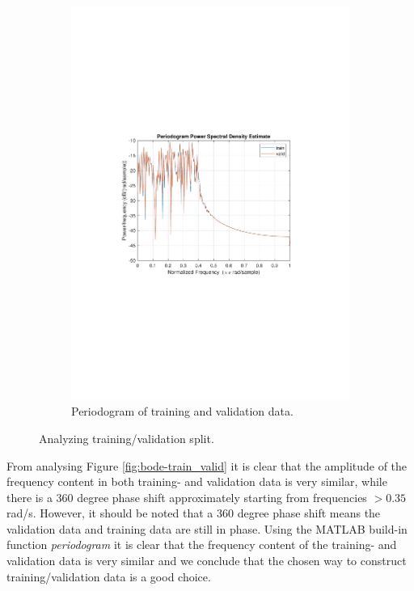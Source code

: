 \documentclass[]{article}
\begin{document}
\begin{figure}[ht]
\begin{subfigure}{.49\textwidth}
	\includegraphics[trim= 10cm 8cm 10cm 8cm, scale=0.4]{figures/periodogram-train_valid.pdf}
	\caption{Periodogram of training and validation data.}
	\label{fig:periodogram-train_valid}
\end{subfigure}
\caption{Analyzing training/validation split.}
\label{fig:train_valid}
\end{figure}

From analysing Figure \ref{fig:bode-train_valid} it is clear that the amplitude of the frequency content in both training- and validation data is very similar, while there is a 360 degree phase shift approximately starting from frequencies $>0.35$ rad/s. However, it should be noted that a 360 degree phase shift means the validation data and training data are still in phase. Using the MATLAB build-in function \emph{periodogram} it is clear that the frequency content of the training- and validation data is very similar and we conclude that the chosen way to construct training/validation data is a good choice.
\end{document}
